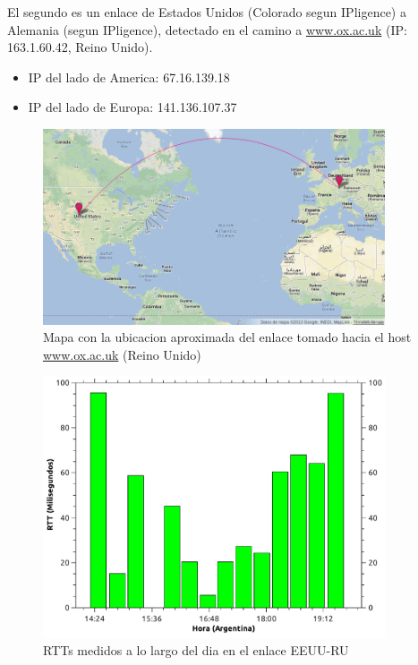 El segundo es un enlace de Estados Unidos (Colorado segun IPligence) a Alemania (segun IPligence), detectado en el camino a \url{www.ox.ac.uk} (IP: 163.1.60.42, Reino Unido).

\begin{itemize}
 \item IP del lado de America: 67.16.139.18
 \item IP del lado de Europa: 141.136.107.37\\
\end{itemize}


\begin{figure}[H]
  \centering
    \includegraphics[width=0.9\textwidth]{imgs/inglaterra_enlace_1.png}
    \caption{Mapa con la ubicacion aproximada del enlace tomado hacia el host \url{www.ox.ac.uk} (Reino Unido)}
    \label{fig:mapa_ing}
\end{figure}


\begin{figure}[H]
  \centering
    \includegraphics[width=0.9\textwidth]{graficos/rtts_dia_finlandia.pdf}
    \caption{RTTs medidos a lo largo del dia en el enlace EEUU-RU}
    \label{fig:rtts_fin}
\end{figure}

